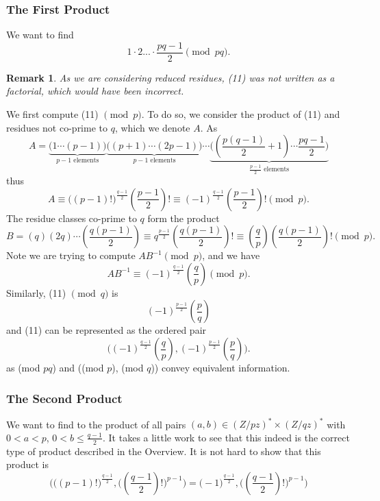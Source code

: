 \documentclass{article}
\newtheorem*{remark}{Remark}
\newcommand{\legendre}[2]{\genfrac{(}{)}{}{}{#1}{#2}}
\begin{document}
\subsubsection{The First Product}
We want to find
\begin{equation}
    1\cdot2...\cdot \frac{pq-1}{2}\pmod{pq}.
\end{equation}
\begin{remark}
    As we are considering reduced residues, (11) was not written as a factorial, which would have been incorrect.
\end{remark}
We first compute (11) $\pmod{p}$. To do so, we consider the product of (11) and residues not co-prime to $q$, which we denote $A$. As
\begin{equation}
    A = \underbrace{\big(1\cdots(p-1)\big)}_{p-1 \textrm{ elements}}
    \underbrace{\big((p+1)\cdots(2p-1)\big)}_{p-1 \textrm{ elements}}
    \cdots
    \underbrace{\big((\frac{p(q-1)}{2}+1)\cdots\frac{pq-1}{2}\big)}_{\frac{p-1}{2} \textrm{ elements}}
\end{equation}
thus
\begin{equation}
    A \equiv \big((p-1)!\big)^{\frac{q-1}{2}}(\frac{p-1}{2})! \equiv (-1)^{\frac{q-1}{2}}(\frac{p-1}{2})! \pmod{p}. 
\end{equation}
The residue classes co-prime to $q$ form the product
\begin{equation}
    B = (q)(2q)\cdots(\frac{q(p-1)}{2}) \equiv q^{\frac{p-1}{2}}(\frac{q(p-1)}{2})! \equiv \legendre{q}{p}(\frac{q(p-1)}{2})!\pmod{p}.
\end{equation}
Note we are trying to compute $AB^{-1}\pmod{p}$, and we have
\begin{equation}
    AB^{-1} \equiv (-1)^{\frac{q-1}{2}}\legendre{q}{p} \pmod{p}.
\end{equation}
Similarly, (11) $\pmod{q}$ is
\begin{equation}
    (-1)^{\frac{p-1}{2}}\legendre{p}{q}
\end{equation}
and (11) can be represented as the ordered pair
\begin{equation}
    \Big((-1)^{\frac{q-1}{2}}\legendre{q}{p}, (-1)^{\frac{p-1}{2}}\legendre{p}{q} \Big).
\end{equation}
as (mod $pq$) and ((mod $p$), (mod $q$)) convey equivalent information.

\subsubsection{The Second Product}
We want to find to the product of all pairs $(a,b) \in (Z/pz)^{*} \times (Z/qz)^{*}$ with $0 < a < p$, $0 < b \leq \frac{q-1}{2}$. It takes a little work to see that this indeed is the correct type of product described in the Overview. It is not hard to show that this product is
\begin{equation}
    \Big(\big((p-1)!\big)^{\frac{q-1}{2}}, \big((\frac{q-1}{2})!\big)^{p-1}
    \Big)
    =
    \Big(-1)^{\frac{q-1}{2}}, \big((\frac{q-1}{2})!\big)^{p-1}
    \Big)
\end{equation}
\end{document}
